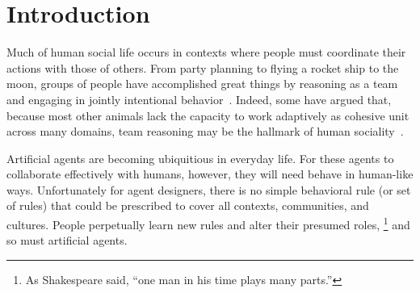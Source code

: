 \section{Introduction}
\label{sec:intro}

Much of human social life occurs in contexts where people must
coordinate their actions with those of others.  From party planning to
flying a rocket ship to the moon, groups of people have accomplished
great things by reasoning as a team and engaging in jointly
intentional behavior~\cite{searle1995construction}.  Indeed, some have
argued that, because most other animals lack the capacity to work
adaptively as cohesive unit across many domains, team reasoning may be
the hallmark of human sociality~\cite{tomasello2005understanding}.


Artificial agents are becoming ubiquitious in everyday life.  For
these agents to collaborate effectively with humans, however, they will
need behave in human-like ways.  Unfortunately for agent designers,
there is no simple behavioral rule (or set of rules) that could be
prescribed to cover all contexts, communities, and cultures.  People
perpetually learn new rules and alter their presumed roles,%
\footnote{As Shakespeare said, ``one man in his time plays many parts.''}
and so must artificial agents.





